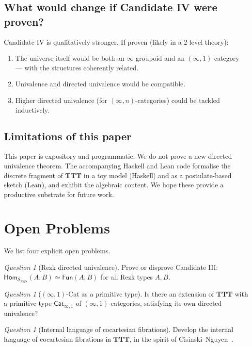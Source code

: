 \documentclass[12pt]{article}
\theoremstyle{definition}
\theoremstyle{remark}
\newtheorem{question}[theorem]{Question}
\newcommand{\Hom}{\mathsf{Hom}}
\newcommand{\Fun}{\mathsf{Fun}}
\newcommand{\eqv}{\simeq}
\newcommand{\TTT}{\mathbf{TTT}}
\begin{document}
\subsection{What would change if Candidate IV were proven?}

Candidate IV is qualitatively stronger. If proven (likely in a 2-level theory):

\begin{enumerate}
\item The universe itself would be both an $\infty$-groupoid and an $(\infty,1)$-category --- with the structures coherently related.
\item Univalence and directed univalence would be compatible.
\item Higher directed univalence (for $(\infty, n)$-categories) could be tackled inductively.
\end{enumerate}

\subsection{Limitations of this paper}

This paper is expository and programmatic. We do not prove a new directed univalence theorem. The accompanying Haskell and Lean code formalise the discrete fragment of $\TTT$ in a toy model (Haskell) and as a postulate-based sketch (Lean), and exhibit the algebraic content. We hope these provide a productive substrate for future work.

\section{Open Problems}\label{sec:open}

We list four explicit open problems.

\begin{question}[Rezk directed univalence]\label{q:rezk}
Prove or disprove Candidate III: $\Hom_{\mathcal{S}_{\mathsf{Rezk}}}(A, B) \eqv \Fun(A, B)$ for all Rezk types $A, B$.
\end{question}

\begin{question}[$(\infty,1)$-Cat as a primitive type]\label{q:icat}
Is there an extension of $\TTT$ with a primitive type $\mathsf{Cat}_{\infty,1}$ of $(\infty,1)$-categories, satisfying its own directed univalence?
\end{question}

\begin{question}[Internal language of cocartesian fibrations]\label{q:cocart}
Develop the internal language of cocartesian fibrations in $\TTT$, in the spirit of Cisinski--Nguyen~\cite{CisinskiNguyen}.
\end{question}
\end{document}
